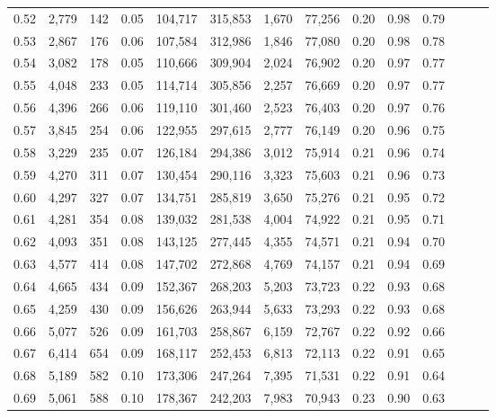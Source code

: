 \begin{tabular}{rrrrrrrrrrrrrr}
0.52 &   2,779 &    142 &  0.05 &  104,717 &  315,853 &   1,670 &  77,256 &  0.20 &  0.98 &      0.79 \\
0.53 &   2,867 &    176 &  0.06 &  107,584 &  312,986 &   1,846 &  77,080 &  0.20 &  0.98 &      0.78 \\
0.54 &   3,082 &    178 &  0.05 &  110,666 &  309,904 &   2,024 &  76,902 &  0.20 &  0.97 &      0.77 \\
0.55 &   4,048 &    233 &  0.05 &  114,714 &  305,856 &   2,257 &  76,669 &  0.20 &  0.97 &      0.77 \\
0.56 &   4,396 &    266 &  0.06 &  119,110 &  301,460 &   2,523 &  76,403 &  0.20 &  0.97 &      0.76 \\
0.57 &   3,845 &    254 &  0.06 &  122,955 &  297,615 &   2,777 &  76,149 &  0.20 &  0.96 &      0.75 \\
0.58 &   3,229 &    235 &  0.07 &  126,184 &  294,386 &   3,012 &  75,914 &  0.21 &  0.96 &      0.74 \\
0.59 &   4,270 &    311 &  0.07 &  130,454 &  290,116 &   3,323 &  75,603 &  0.21 &  0.96 &      0.73 \\
0.60 &   4,297 &    327 &  0.07 &  134,751 &  285,819 &   3,650 &  75,276 &  0.21 &  0.95 &      0.72 \\
0.61 &   4,281 &    354 &  0.08 &  139,032 &  281,538 &   4,004 &  74,922 &  0.21 &  0.95 &      0.71 \\
0.62 &   4,093 &    351 &  0.08 &  143,125 &  277,445 &   4,355 &  74,571 &  0.21 &  0.94 &      0.70 \\
0.63 &   4,577 &    414 &  0.08 &  147,702 &  272,868 &   4,769 &  74,157 &  0.21 &  0.94 &      0.69 \\
0.64 &   4,665 &    434 &  0.09 &  152,367 &  268,203 &   5,203 &  73,723 &  0.22 &  0.93 &      0.68 \\
0.65 &   4,259 &    430 &  0.09 &  156,626 &  263,944 &   5,633 &  73,293 &  0.22 &  0.93 &      0.68 \\
0.66 &   5,077 &    526 &  0.09 &  161,703 &  258,867 &   6,159 &  72,767 &  0.22 &  0.92 &      0.66 \\
0.67 &   6,414 &    654 &  0.09 &  168,117 &  252,453 &   6,813 &  72,113 &  0.22 &  0.91 &      0.65 \\
0.68 &   5,189 &    582 &  0.10 &  173,306 &  247,264 &   7,395 &  71,531 &  0.22 &  0.91 &      0.64 \\
0.69 &   5,061 &    588 &  0.10 &  178,367 &  242,203 &   7,983 &  70,943 &  0.23 &  0.90 &      0.63 \\

\end{tabular}
